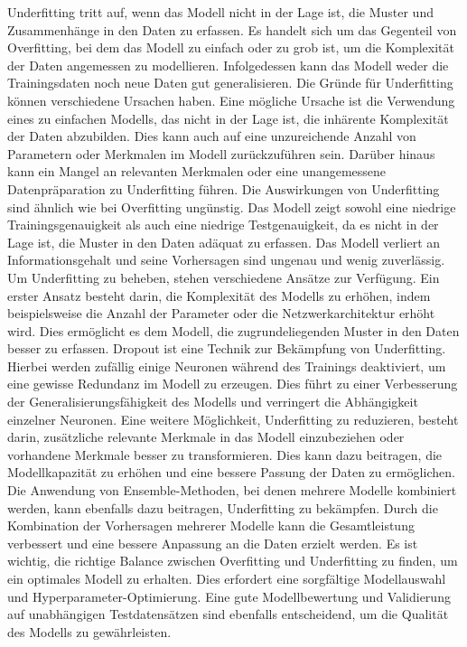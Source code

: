     Underfitting tritt auf, wenn das Modell nicht in der Lage ist, die  Muster und Zusammenhänge in den Daten zu erfassen. 
    Es handelt sich um das Gegenteil von Overfitting, bei dem das Modell zu einfach oder zu grob ist, um die Komplexität der Daten angemessen zu modellieren. 
    Infolgedessen kann das Modell weder die Trainingsdaten noch neue Daten gut generalisieren.
    Die Gründe für Underfitting können verschiedene Ursachen haben. Eine mögliche Ursache ist die Verwendung eines zu einfachen Modells, das nicht in der Lage ist, die inhärente Komplexität der Daten abzubilden. 
    Dies kann auch auf eine unzureichende Anzahl von Parametern oder Merkmalen im Modell zurückzuführen sein. Darüber hinaus kann ein Mangel an relevanten Merkmalen oder eine unangemessene Datenpräparation zu Underfitting führen.
    Die Auswirkungen von Underfitting sind ähnlich wie bei Overfitting ungünstig. 
    Das Modell zeigt sowohl eine niedrige Trainingsgenauigkeit als auch eine niedrige Testgenauigkeit, da es nicht in der Lage ist, die Muster in den Daten adäquat zu erfassen. 
    Das Modell verliert an Informationsgehalt und seine Vorhersagen sind ungenau und wenig zuverlässig.
    Um Underfitting zu beheben, stehen verschiedene Ansätze zur Verfügung. 
    Ein erster Ansatz besteht darin, die Komplexität des Modells zu erhöhen, indem beispielsweise die Anzahl der Parameter oder die Netzwerkarchitektur erhöht wird. 
    Dies ermöglicht es dem Modell, die zugrundeliegenden Muster in den Daten besser zu erfassen.
    Dropout ist eine Technik zur Bekämpfung von Underfitting. Hierbei werden zufällig einige Neuronen während des Trainings deaktiviert, um eine gewisse Redundanz im Modell zu erzeugen. Dies führt zu einer Verbesserung der Generalisierungsfähigkeit des Modells und verringert die Abhängigkeit einzelner Neuronen.
    Eine weitere Möglichkeit, Underfitting zu reduzieren, besteht darin, zusätzliche relevante Merkmale in das Modell einzubeziehen oder vorhandene Merkmale besser zu transformieren. 
    Dies kann dazu beitragen, die Modellkapazität zu erhöhen und eine bessere Passung der Daten zu ermöglichen.
    Die Anwendung von Ensemble-Methoden, bei denen mehrere Modelle kombiniert werden, kann ebenfalls dazu beitragen, Underfitting zu bekämpfen. Durch die Kombination der Vorhersagen mehrerer Modelle kann die Gesamtleistung verbessert und eine bessere Anpassung an die Daten erzielt werden.
    Es ist wichtig, die richtige Balance zwischen Overfitting und Underfitting zu finden, um ein optimales Modell zu erhalten. 
    Dies erfordert eine sorgfältige Modellauswahl und Hyperparameter-Optimierung. Eine gute Modellbewertung und Validierung auf unabhängigen Testdatensätzen sind ebenfalls entscheidend, um die Qualität des Modells zu gewährleisten.

